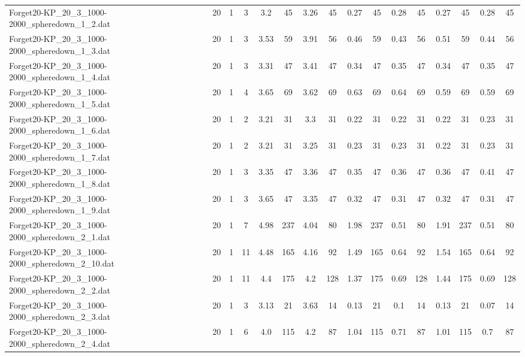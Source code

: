 \begin{sidewaystable}[!ht]
{\begin{tabular}{lccccccccccccccc}
Forget20-KP\_20\_3\_1000-2000\_spheredown\_1\_2.dat & 20 & 1 & 3 & 3.2 & 45 & 3.26 & 45 &  \textcolor{blue2}{0.27} & 45 & 0.28 & 45 &  \textcolor{blue2}{0.27} & 45 & 0.28 & 45 \\
Forget20-KP\_20\_3\_1000-2000\_spheredown\_1\_3.dat & 20 & 1 & 3 & 3.53 & 59 & 3.91 & 56 & 0.46 & 59 &  \textcolor{blue2}{0.43} & 56 & 0.51 & 59 & 0.44 & 56 \\
Forget20-KP\_20\_3\_1000-2000\_spheredown\_1\_4.dat & 20 & 1 & 3 & 3.31 & 47 & 3.41 & 47 &  \textcolor{blue2}{0.34} & 47 & 0.35 & 47 &  \textcolor{blue2}{0.34} & 47 & 0.35 & 47 \\
Forget20-KP\_20\_3\_1000-2000\_spheredown\_1\_5.dat & 20 & 1 & 4 & 3.65 & 69 & 3.62 & 69 & 0.63 & 69 & 0.64 & 69 &  \textcolor{blue2}{0.59} & 69 &  \textcolor{blue2}{0.59} & 69 \\
Forget20-KP\_20\_3\_1000-2000\_spheredown\_1\_6.dat & 20 & 1 & 2 & 3.21 & 31 & 3.3 & 31 &  \textcolor{blue2}{0.22} & 31 &  \textcolor{blue2}{0.22} & 31 &  \textcolor{blue2}{0.22} & 31 & 0.23 & 31 \\
Forget20-KP\_20\_3\_1000-2000\_spheredown\_1\_7.dat & 20 & 1 & 2 & 3.21 & 31 & 3.25 & 31 & 0.23 & 31 & 0.23 & 31 &  \textcolor{blue2}{0.22} & 31 & 0.23 & 31 \\
Forget20-KP\_20\_3\_1000-2000\_spheredown\_1\_8.dat & 20 & 1 & 3 & 3.35 & 47 & 3.36 & 47 &  \textcolor{blue2}{0.35} & 47 & 0.36 & 47 & 0.36 & 47 & 0.41 & 47 \\
Forget20-KP\_20\_3\_1000-2000\_spheredown\_1\_9.dat & 20 & 1 & 3 & 3.65 & 47 & 3.35 & 47 & 0.32 & 47 &  \textcolor{blue2}{0.31} & 47 & 0.32 & 47 &  \textcolor{blue2}{0.31} & 47 \\
Forget20-KP\_20\_3\_1000-2000\_spheredown\_2\_1.dat & 20 & 1 & 7 & 4.98 & 237 & 4.04 & 80 & 1.98 & 237 &  \textcolor{blue2}{0.51} & 80 & 1.91 & 237 &  \textcolor{blue2}{0.51} & 80 \\
Forget20-KP\_20\_3\_1000-2000\_spheredown\_2\_10.dat & 20 & 1 & 11 & 4.48 & 165 & 4.16 & 92 & 1.49 & 165 &  \textcolor{blue2}{0.64} & 92 & 1.54 & 165 &  \textcolor{blue2}{0.64} & 92 \\
Forget20-KP\_20\_3\_1000-2000\_spheredown\_2\_2.dat & 20 & 1 & 11 & 4.4 & 175 & 4.2 & 128 & 1.37 & 175 &  \textcolor{blue2}{0.69} & 128 & 1.44 & 175 &  \textcolor{blue2}{0.69} & 128 \\
Forget20-KP\_20\_3\_1000-2000\_spheredown\_2\_3.dat & 20 & 1 & 3 & 3.13 & 21 & 3.63 & 14 & 0.13 & 21 & 0.1 & 14 & 0.13 & 21 &  \textcolor{blue2}{0.07} & 14 \\
Forget20-KP\_20\_3\_1000-2000\_spheredown\_2\_4.dat & 20 & 1 & 6 & 4.0 & 115 & 4.2 & 87 & 1.04 & 115 & 0.71 & 87 & 1.01 & 115 &  \textcolor{blue2}{0.7} & 87 \\

\end{tabular}}
\end{sidewaystable}
